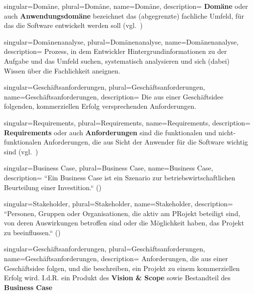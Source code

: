 {
singular={Domäne},
plural={Domäne},
name={Domäne},
description={
\textbf{Domäne} oder auch \textbf{Anwendungsdomäne} bezeichnet das (abgegrenzte) fachliche Umfeld, für das die Software entwickelt werden soll (vgl.~\cite[41]{Wed09})
}
}

{
singular={Domänenanalyse},
plural={Domänenanalyse},
name={Domänenanalyse},
description={
Prozess, in dem Entwickler Hintergrundinformationen zu der Aufgabe und das Umfeld suchen, systematisch analysieren und sich (dabei) Wissen über die Fachlichkeit aneignen.
}
}

{
singular={Geschäftsanforderungen},
plural={Geschäftsanforderungen},
name={Geschäftsanforderungen},
description={
Die aus einer Geschäftsidee folgenden, kommerziellen Erfolg versprechenden Anforderungen.
}
}

{
singular={Requirements},
plural={Requirements},
name={Requirements},
description={
\textbf{Requirements} oder auch \textbf{Anforderungen} sind die funktionalen und nicht-funktionalen Anforderungen, die aus Sicht der Anwender für die Software wichtig sind  (vgl.~\cite[41]{Wed09})
}
}

{
singular={Business Case},
plural={Business Case},
name={Business Case},
description={
``Ein Business Case ist ein Szenario zur betriebswirtschaftlichen Beurteilung einer Investition.`` (\cite[11]{Brug09})
}
}

{
singular={Stakeholder},
plural={Stakeholder},
name={Stakeholder},
description={
``Personen, Gruppen oder Organisationen, die aktiv am PRojekt beteiligt sind, von deren Auswirkungen betroffen sind oder die Möglichkeit haben, das Projekt zu beeinflussen.`` (\cite[49]{Wed09})
}
}


{
singular={Geschäftsanforderungen},
plural={Geschäftsanforderungen},
name={Geschäftsanforderungen},
description={
Anforderungen, die aus einer Geschäftsidee folgen, und die beschreiben, ein Projekt zu einem kommerziellen Erfolg wird. I.d.R. ein Produkt des \textbf{Vision \& Scope} sowie Bestandteil des \textbf{Business Case}
}
}
